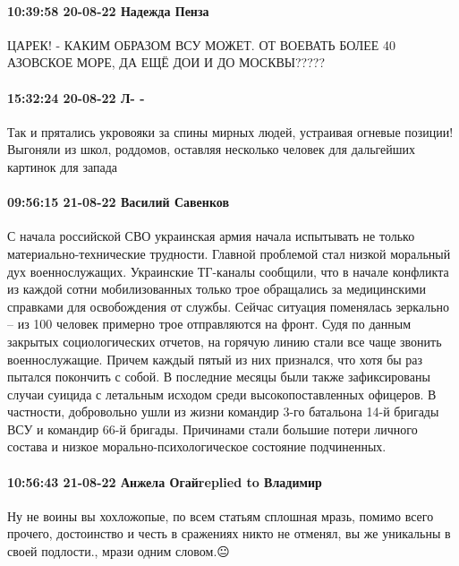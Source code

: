 \paragraph{10:39:58 20-08-22 Надежда Пенза}

ЦАРЕК! - КАКИМ ОБРАЗОМ ВСУ МОЖЕТ. ОТ ВОЕВАТЬ БОЛЕЕ 40%
АЗОВСКОЕ МОРЕ, ДА ЕЩЁ ДОИ И ДО МОСКВЫ?????

\paragraph{15:32:24 20-08-22 Л- -}

Так и прятались укровояки за спины мирных людей, устраивая огневые позиции!
Выгоняли из школ, роддомов, оставляя несколько человек для дальгейших картинок
для запада

\paragraph{09:56:15 21-08-22 Василий Савенков}

С начала российской СВО украинская армия начала испытывать не только
материально-технические трудности. Главной проблемой стал низкой моральный дух
военнослужащих. Украинские ТГ-каналы сообщили, что в начале конфликта из каждой
сотни мобилизованных только трое обращались за медицинскими справками для
освобождения от службы. Сейчас ситуация поменялась зеркально – из 100 человек
примерно трое отправляются на фронт. Судя по данным закрытых социологических
отчетов, на горячую линию стали все чаще звонить военнослужащие. Причем каждый
пятый из них признался, что хотя бы раз пытался покончить с собой. В последние
месяцы были также зафиксированы случаи суицида с летальным исходом среди
высокопоставленных офицеров. В частности, добровольно ушли из жизни командир
3-го батальона 14-й бригады ВСУ и командир 66-й бригады. Причинами стали
большие потери личного состава и низкое морально-психологическое состояние
подчиненных.

\paragraph{10:56:43 21-08-22 Анжела Огайreplied to Владимир}

Ну не воины вы хохложопые, по всем статьям сплошная мразь, помимо всего
прочего, достоинство и честь в сражениях никто не отменял, вы же уникальны в
своей подлости., мрази одним словом.😐


